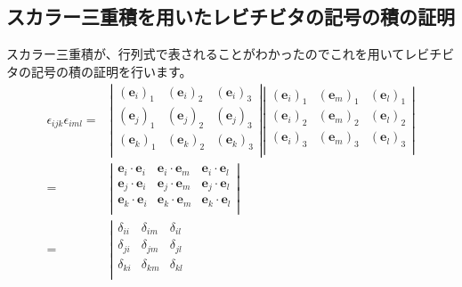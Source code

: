 \documentclass{ltjarticle}
\begin{document}
    \subsection{スカラー三重積を用いたレビチビタの記号の積の証明}
    スカラー三重積が、行列式で表されることがわかったのでこれを用いてレビチビタの記号の積の証明を行います。
    \begin{align*}
        \epsilon_{ijk}\epsilon_{iml} =&
        \left|
        \begin{array}{ccc}
            \left(\bm{e}_i\right)_1 & \left(\bm{e}_i\right)_2 & \left(\bm{e}_i\right)_3 \\
            \left(\bm{e}_j\right)_1 & \left(\bm{e}_j\right)_2 & \left(\bm{e}_j\right)_3 \\
            \left(\bm{e}_k\right)_1 & \left(\bm{e}_k\right)_2 & \left(\bm{e}_k\right)_3 \\
        \end{array}
        \right|
        \left|
        \begin{array}{ccc}
            \left(\bm{e}_i\right)_1 & \left(\bm{e}_m\right)_1 & \left(\bm{e}_l\right)_1 \\
            \left(\bm{e}_i\right)_2 & \left(\bm{e}_m\right)_2 & \left(\bm{e}_l\right)_2 \\
            \left(\bm{e}_i\right)_3 & \left(\bm{e}_m\right)_3 & \left(\bm{e}_l\right)_3 \\
        \end{array}
        \right| \\
        =&
        \left|
            \begin{array}{ccc}
                \bm{e}_i\cdot\bm{e}_i & \bm{e}_i\cdot\bm{e}_m & \bm{e}_i\cdot\bm{e}_l \\
                \bm{e}_j\cdot\bm{e}_i & \bm{e}_j\cdot\bm{e}_m & \bm{e}_j\cdot\bm{e}_l \\
                \bm{e}_k\cdot\bm{e}_i & \bm{e}_k\cdot\bm{e}_m & \bm{e}_k\cdot\bm{e}_l \\
            \end{array}
        \right|\\
        =&
        \left|
        \begin{array}{ccc}
            \delta_{ii} & \delta_{im} & \delta_{il} \\
            \delta_{ji} & \delta_{jm} & \delta_{jl} \\
            \delta_{ki} & \delta_{km} & \delta_{kl} \\
        \end{array}

\end{align*}
\end{document}
